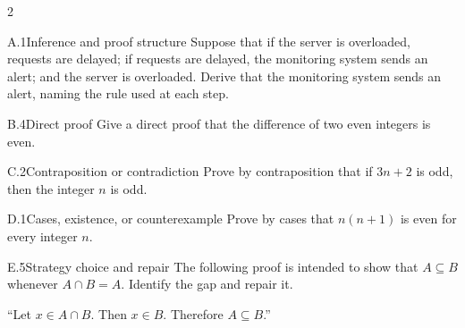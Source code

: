 \documentclass[9pt]{extarticle}
\begin{document}
\begin{multicols}{2}
\begin{CoreProblem}{A.1}{Inference and proof structure}
Suppose that if the server is overloaded, requests are delayed; if requests are
delayed, the monitoring system sends an alert; and the server is overloaded.
Derive that the monitoring system sends an alert, naming the rule used at each
step.
\end{CoreProblem}
\begin{CoreProblem}{B.4}{Direct proof}
Give a direct proof that the difference of two even integers is even.
\end{CoreProblem}
\begin{CoreProblem}{C.2}{Contraposition or contradiction}
Prove by contraposition that if $3n+2$ is odd, then the integer $n$ is odd.
\end{CoreProblem}
\columnbreak
\begin{CoreProblem}{D.1}{Cases, existence, or counterexample}
Prove by cases that $n(n+1)$ is even for every integer $n$.
\end{CoreProblem}
\begin{CoreProblem}{E.5}{Strategy choice and repair}
The following proof is intended to show that $A\subseteq B$ whenever
$A\cap B=A$. Identify the gap and repair it.

``Let $x\in A\cap B$. Then $x\in B$. Therefore $A\subseteq B$.''
\end{CoreProblem}
\end{multicols}
\CoreWorkArea
\FormBreak
{}
\end{document}
